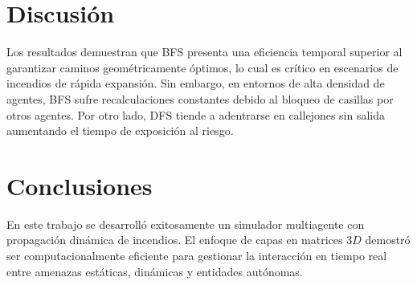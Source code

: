 \documentclass[11pt, a4paper]{article}
\begin{document}
\section{Discusión}
Los resultados demuestran que BFS presenta una eficiencia temporal superior al garantizar caminos geométricamente óptimos, lo cual es crítico en escenarios de incendios de rápida expansión. Sin embargo, en entornos de alta densidad de agentes, BFS sufre recalculaciones constantes debido al bloqueo de casillas por otros agentes. Por otro lado, DFS tiende a adentrarse en callejones sin salida aumentando el tiempo de exposición al riesgo.

\section{Conclusiones}
En este trabajo se desarrolló exitosamente un simulador multiagente con propagación dinámica de incendios. El enfoque de capas en matrices $3D$ demostró ser computacionalmente eficiente para gestionar la interacción en tiempo real entre amenazas estáticas, dinámicas y entidades autónomas. 
\end{document}
